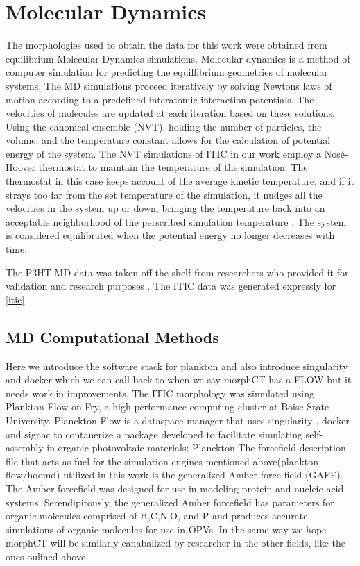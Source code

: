 \section{Molecular Dynamics}
\label{md}
The morphologies used to
obtain the data for this work were obtained from equilibrium Molecular Dynamics simulations. 
Molecular dynamics is a method of computer simulation for predicting the equillibrium geometries of molecular
systems. The MD simulations proceed iteratively by solving Newtons laws of motion
according to a predefined interatomic interaction potentials. The velocities of molecules are
updated at each iteration based on these solutions.  Using the canonical ensemble (NVT),
holding the number of
particles, the volume, and the temperature constant allows for the calculation of 
potential energy of the system. The NVT simulations of ITIC in our work employ a
Nos\'{e}-Hoover thermostat to maintain the temperature of the simulation. The thermostat in this case keeps
account of the average kinetic temperature, and if it strays too far from the set temperature of the
simulation, it nudges all the velocities in the system up or down, bringing the temperature back into an
acceptable neighborhood of the perscribed simulation temperature \cite{Martyna1994d}\cite{Cao1996}.
The system is considered equilibrated when the potential energy no longer decreases with time. 

The P3HT MD data was taken off-the-shelf \cite{P3HTData} from researchers who provided it for validation and
research purposes \cite{Miller2018a}. The ITIC data was generated expressly for \autoref{itic}

\subsection{MD Computational Methods}

Here we introduce the software stack for plankton and also introduce singularity and docker which we can call
back to when we say morphCT has a FLOW but it needs work in improvements.
The ITIC morphology was simulated using Plankton-Flow \cite{cmelab} on Fry, a high performance computing cluster at Boise State University. Planckton-Flow is a dataspace manager that uses
singularity \cite{singularity2017}, docker and signac to contanerize a package developed to facilitate simulating self-assembly in
organic photovoltaic materials; Planckton \cite{cmelab}
The forcefield description file that acts as
fuel for the simulation engines mentioned above(plankton-flow/hoomd) utilized in this work is the generalized
Amber force field (GAFF)\cite{Wang2004a}.
The Amber forcefield was designed for use in modeling protein and
nucleic acid systems.  Serendipitously, the generalized Amber forcefield has parameters for organic molecules
comprised of H,C,N,O, and P and produces accurate simulations of organic molecules for use in OPVs. In the
same way we hope morphCT will be similarly canabalized by researcher in the other fields, like the ones oulined above. 

